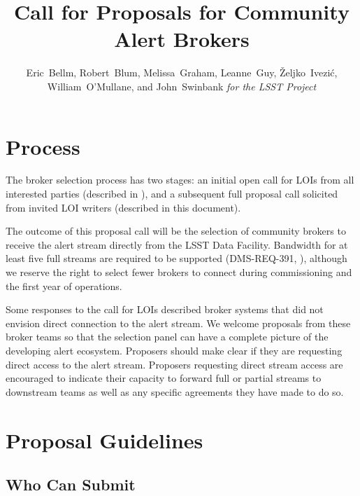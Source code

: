 \documentclass[DM,toc,lsstdraft]{lsstdoc}
\title{Call for Proposals for Community Alert Brokers}
\author{
Eric~Bellm,
Robert~Blum,
Melissa~Graham,
Leanne~Guy,
\v{Z}eljko~Ivezi\'{c},
William~O'Mullane,
and John~Swinbank
\emph{for the LSST Project}
}
\begin{document}

\maketitle

\section{Process}

The broker selection process has two stages:
an initial open call for LOIs from all interested parties (described in ), and a subsequent full proposal call solicited from invited LOI writers (described in this document).

The outcome of this proposal call will be the selection of community brokers to receive the alert stream directly from the LSST Data Facility.
Bandwidth for at least five full streams are required to be supported (DMS-REQ-391, ), although we reserve the right to select fewer brokers to connect during commissioning and the first year of operations.

Some responses to the call for LOIs described broker systems that did not envision direct connection to the alert stream.
We welcome proposals from these broker teams so that the selection panel can have a complete picture of the developing alert ecosystem.
Proposers should make clear if they are requesting direct access to the alert stream.
Proposers requesting direct stream access are encouraged to indicate their capacity to forward full or partial streams to downstream teams as well as any specific agreements they have made to do so. 


\section{Proposal Guidelines}

\subsection{Who Can Submit}
\end{document}
